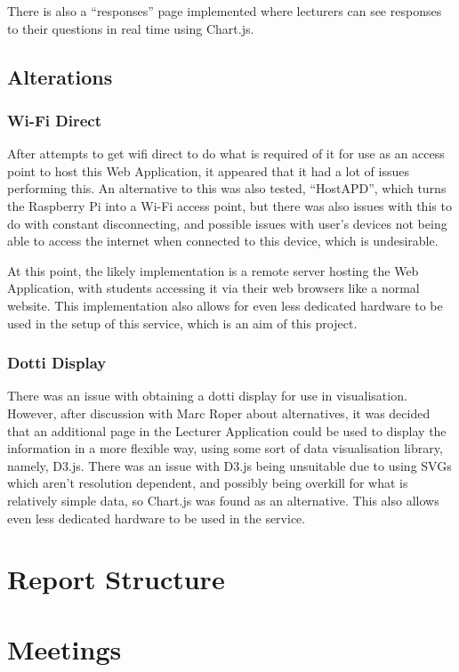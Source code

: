 \documentclass{article}
\begin{document}
There is also a ``responses'' page implemented where lecturers can see responses to their questions in real time using Chart.js.

\subsection{Alterations}
\subsubsection {Wi-Fi Direct}
After attempts to get wifi direct to do what is required of it for use as an access point to host this Web Application, it appeared that it had a lot of issues performing this. An alternative to this was also tested, ``HostAPD'', which turns the Raspberry Pi into a Wi-Fi access point, but there was also issues with this to do with constant disconnecting, and possible issues with user's devices not being able to access the internet when connected to this device, which is undesirable.

At this point, the likely implementation is a remote server hosting the Web Application, with students accessing it via their web browsers like a normal website. This implementation also allows for even less dedicated hardware to be used in the setup of this service, which is an aim of this project.

\subsubsection{Dotti Display}
There was an issue with obtaining a dotti display for use in visualisation. However, after discussion with Marc Roper about alternatives, it was decided that an additional page in the Lecturer Application could be used to display the information in a more flexible way, using some sort of data visualisation library, namely, D3.js. There was an issue with D3.js being unsuitable due to using SVGs which aren't resolution dependent, and possibly being overkill for what is relatively simple data, so Chart.js was found as an alternative. This also allows even less dedicated hardware to be used in the service.

\newpage
\section{Report Structure}


\newpage
\section{Meetings}
\end{document}
